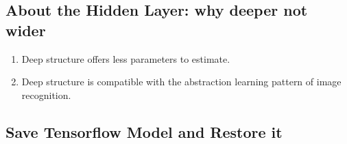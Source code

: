 \documentclass{article}
\begin{document}
\subsection{About the Hidden Layer: why deeper not wider}

\begin{enumerate}
	\item Deep structure offers less parameters to estimate.
	\item Deep structure is compatible with the abstraction learning pattern of image recognition.
\end{enumerate}

\subsection{Save Tensorflow Model and Restore it}
\end{document}

